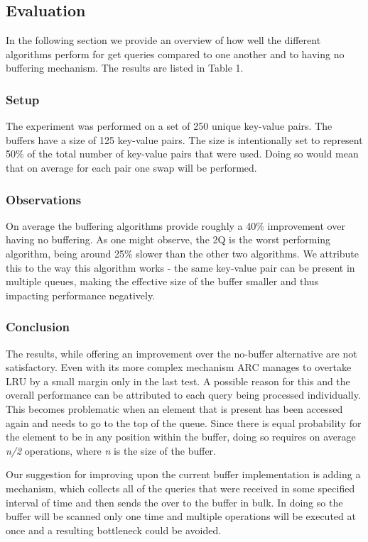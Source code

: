 \documentclass[a4paper, twocolumn,11pt]{article}
\begin{document}
\subsection{Evaluation}
In the following section we provide an overview of how well the different algorithms perform for get queries compared to one another and to having no buffering mechanism. The results are listed in Table 1. 

\subsubsection{Setup}
The experiment was performed on a set of 250 unique key-value pairs. The buffers have a size of 125 key-value pairs. The size is intentionally set to represent 50\% of the total number of key-value pairs that were used. Doing so would mean that on average for each pair one swap will be performed.

\subsubsection{Observations}
On average the buffering algorithms provide roughly a 40\% improvement over having no buffering. As one might observe, the 2Q is the worst performing algorithm, being around 25\% slower than the other two algorithms. We attribute this to the way this algorithm works - the same key-value pair can be present in multiple queues, making the effective size of the buffer smaller and thus impacting performance negatively.

\subsubsection{Conclusion}
The results, while offering an improvement over the no-buffer alternative are not satisfactory. Even with its more complex mechanism ARC manages to overtake LRU by a small margin only in the last test. A possible reason for this and the overall performance can be attributed to each query being processed individually. This becomes problematic when an element that is present has been accessed again and needs to go to the top of the queue. Since there is equal probability for the element to be in any position within the buffer, doing so requires on average \textit{n/2} operations, where \textit{n} is the size of the buffer.

Our suggestion for improving upon the current buffer implementation is adding a mechanism, which collects all of the queries that were received in some specified interval of time and then sends the over to the buffer in bulk. In doing so the buffer will be scanned only one time and multiple operations will be executed at once and a resulting bottleneck could be avoided. 	
\end{document}
